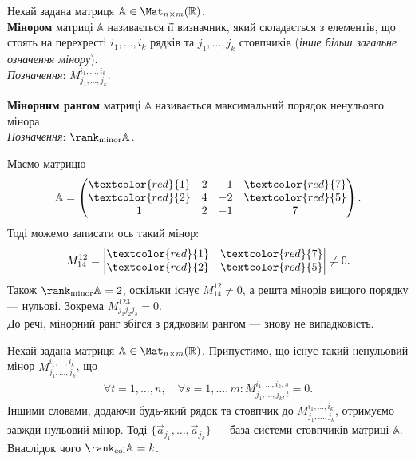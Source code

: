 \documentclass{math_library}
\begin{document}
\begin{definition}
Нехай задана матриця $\mathbb{A} \in \Mat_{n \times m}(\mathbb{R})$.\\
\textbf{Мінором} матриці $\mathbb{A}$ називається її визначник, який складається з елементів, що стоять на перехресті $i_1,\dots,i_k$ рядків та $j_1,\dots,j_k$ стовпчиків (\textit{інше більш загальне означення мінору}).\\
\textit{Позначення}: $M_{j_1,\dots,j_k}^{i_1,\dots,i_k}$.
\end{definition}

\begin{definition}
\textbf{Мінорним рангом} матриці $\mathbb{A}$ називається максимальний порядок ненульовго мінора.\\
\textit{Позначення}: $\rank_{\textrm{minor}} \mathbb{A}$.
\end{definition}

\begin{example}
Маємо матрицю 
\[
\mathbb{A} = \begin{pmatrix}
\textcolor{red}{1} & 2 & -1 & \textcolor{red}{7} \\
\textcolor{red}{2} & 4 & -2 & \textcolor{red}{5} \\
1 & 2 & -1 & 7
\end{pmatrix}.
\]
Тоді можемо записати ось такий мінор:
\[
M_{14}^{12} = \begin{vmatrix}
\textcolor{red}{1} & \textcolor{red}{7} \\
\textcolor{red}{2} & \textcolor{red}{5}
\end{vmatrix} \neq 0.
\]
Також $\rank_{\text{minor}} \mathbb{A} = 2$, оскільки існує $M_{14}^{12} \neq 0$, а решта мінорів вищого порядку --- нульові. Зокрема $M^{123}_{j_1j_2j_3} = 0$.
\bigskip \\
До речі, мінорний ранг збігся з рядковим рангом --- знову не випадковість.
\end{example}

\begin{theorem}
Нехай задана матриця $\mathbb{A} \in \Mat_{n \times m}(\mathbb{R})$. Припустимо, що існує такий ненульовий мінор $M_{j_1,\dots,j_k}^{i_1,\dots,i_k}$, що
\begin{align*}
\forall t = 1,\dots,n,\quad \forall s = 1,\dots,m: M_{j_1,\dots,j_k,t}^{i_1,\dots,i_k,s} = 0.
\end{align*}
Іншими словами, додаючи будь-який рядок та стовпчик до $M_{j_1,\dots,j_k}^{i_1,\dots,i_k}$, отримуємо завжди нульовий мінор. Тоді $\{\vec{a}_{j_1},\dots,\vec{a}_{j_k}\}$ --- база системи стовпчиків матриці $\mathbb{A}$. Внаслідок чого $\rank_{\text{col}} \mathbb{A} = k$.
\end{theorem}
\end{document}
